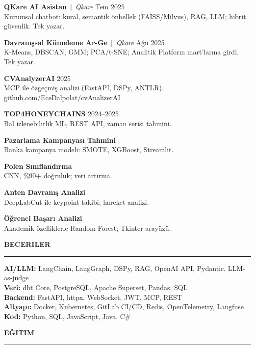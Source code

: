 \documentclass[11pt,a4paper]{article}
\newcommand{\cvsection}[1]{%
  \vspace{1.2em}%
  {\large\textbf{\MakeUppercase{#1}}}\\[0.2em]
  \hrule
  \vspace{0.6em}%
}
\begin{document}
\textbf{QKare AI Asistan} \,|\, \textit{Qkare} \hfill Tem 2025\\
Kurumsal chatbot: kural, semantik önbellek (FAISS/Milvus), RAG, LLM; hibrit güvenlik. Tek yazar.
\vspace{0.5em}

\textbf{Davranışsal Kümeleme Ar-Ge} \,|\, \textit{Qkare} \hfill Ağu 2025\\
K-Means, DBSCAN, GMM; PCA/t-SNE; Analitik Platform mart'larına girdi. Tek yazar.
\vspace{0.5em}

\textbf{CVAnalyzerAI} \hfill 2025\\
MCP ile özgeçmiş analizi (FastAPI, DSPy, ANTLR). github.com/EceDalpolat/cvAnalizerAI
\vspace{0.5em}

\textbf{TOP4HONEYCHAINS} \hfill 2024--2025\\
Bal izlenebilirlik ML, REST API, zaman serisi tahmini.
\vspace{0.5em}

\textbf{Pazarlama Kampanyası Tahmini}\\
Banka kampanya modeli: SMOTE, XGBoost, Streamlit.
\vspace{0.5em}

\textbf{Polen Sınıflandırma}\\
CNN, \%90+ doğruluk; veri artırma.
\vspace{0.5em}

\textbf{Anten Davranış Analizi}\\
DeepLabCut ile keypoint takibi; hareket analizi.
\vspace{0.5em}

\textbf{Öğrenci Başarı Analizi}\\
Akademik özelliklerle Random Forest; Tkinter arayüzü.

\cvsection{Beceriler}

\textbf{AI/LLM:} LangChain, LangGraph, DSPy, RAG, OpenAI API, Pydantic, LLM-as-judge\\[0.2em]
\textbf{Veri:} dbt Core, PostgreSQL, Apache Superset, Pandas, SQL\\[0.2em]
\textbf{Backend:} FastAPI, httpx, WebSocket, JWT, MCP, REST\\[0.2em]
\textbf{Altyapı:} Docker, Kubernetes, GitLab CI/CD, Redis, OpenTelemetry, Langfuse\\[0.2em]
\textbf{Kod:} Python, SQL, JavaScript, Java, C\#

\cvsection{Eğitim}
\end{document}
